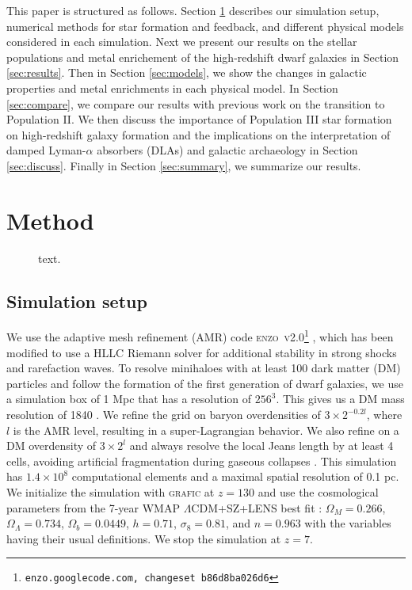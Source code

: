 \documentclass[useAMS,usenatbib]{mn2e}
\begin{document}
This paper is structured as follows.  Section \ref{sec:setup}
describes our simulation setup, numerical methods for star formation
and feedback, and different physical models considered in each
simulation.  Next we present our results on the stellar populations
and metal enrichement of the high-redshift dwarf galaxies in Section
\ref{sec:results}.  Then in Section \ref{sec:models}, we show the
changes in galactic properties and metal enrichments in each physical
model.  In Section \ref{sec:compare}, we compare our results with
previous work on the transition to Population II.  We then discuss the
importance of Population III star formation on high-redshift galaxy
formation and the implications on the interpretation of damped
Lyman-$\alpha$ absorbers (DLAs) and galactic archaeology in Section
\ref{sec:discuss}.  Finally in Section \ref{sec:summary}, we summarize
our results.

\section{Method}
\label{sec:setup}

\begin{figure*}
  \caption{\label{fig:evo-mosaic} text.}
\end{figure*}

\subsection{Simulation setup}

We use the adaptive mesh refinement (AMR) code
\textsc{enzo~v2.0}\footnote{\texttt{enzo.googlecode.com, changeset
    b86d8ba026d6}} \citep{OShea2004}, which has been modified to use a
HLLC Riemann solver \citep{Toro94_HLLC} for additional stability in
strong shocks and rarefaction waves.  To resolve minihaloes with at
least 100 dark matter (DM) particles and follow the formation of the
first generation of dwarf galaxies, we use a simulation box of 1 Mpc
that has a resolution of $256^3$.  This gives us a DM mass resolution
of 1840 \Ms.  We refine the grid on baryon overdensities of $3 \times
2^{-0.2l}$, where $l$ is the AMR level, resulting in a
super-Lagrangian behavior.  We also refine on a DM overdensity of $3
\times 2^l$ and always resolve the local Jeans length by at least 4
cells, avoiding artificial fragmentation during gaseous collapses
\citep{Truelove97}.  This simulation has $1.4 \times 10^8$
computational elements and a maximal spatial resolution of 0.1 pc.  We
initialize the simulation with \textsc{grafic} \citep{Bertschinger01}
at $z = 130$ and use the cosmological parameters from the 7-year WMAP
$\Lambda$CDM+SZ+LENS best fit \citep{WMAP7}: $\Omega_M = 0.266$,
$\Omega_\Lambda = 0.734$, $\Omega_b = 0.0449$, $h = 0.71$, $\sigma_8 =
0.81$, and $n = 0.963$ with the variables having their usual
definitions.  We stop the simulation at $z=7$.
\end{document}
